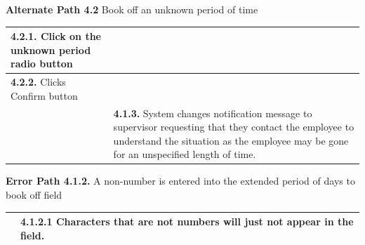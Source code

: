 \documentclass[letterpaper,12pt]{report}
\begin{document}
{\centering \textbf{Alternate Path 4.2}
\linebreak Book off an unknown period of time
\begin{center}
\xuchead
\begin{tabular}{| p{8.5cm} | p{8.5cm} |}
\hline
\textbf{4.2.1.} Click on the unknown period radio button  & \\
\hline
\textbf{4.2.2.} Clicks Confirm button & \\
\hline
& \textbf{4.1.3.} System\index{system} changes notification message to supervisor requesting that they contact the employee to understand the situation as the employee may be gone for an unspecified length of time. \\
\hline
\end{tabular}
\end{center}

\centering \textbf{Error Path 4.1.2.}
\linebreak A non-number is entered into the extended period of days to book off field
\begin{center}
\xuchead
\begin{tabular}{| p{8.5cm} | p{8.5cm} |}
\hline
& \textbf{4.1.2.1} Characters that are not numbers will just not appear in the field. \\
\hline
\end{tabular}
\end{center}

}

\pagebreak
\end{document}
